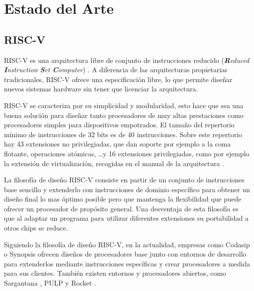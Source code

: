 \chapter{Estado del Arte}

\section{RISC-V}

RISC-V es una arquitectura libre de conjunto de instrucciones reducido (\textit{\textbf{R}educed \textbf{I}nstruction \textbf{S}et \textbf{C}omputer}) \cite{ricv_org}. A diferencia de las arquitecturas propietarias tradicionales, RISC-V ofrece una especificación libre, lo que permite diseñar nuevos sistemas hardware sin tener que licenciar la arquitectura.


RISC-V se caracteriza por su simplicidad y modularidad, esto hace que sea una buena solución para diseñar tanto procesadores de muy altas prestaciones como procesadores simples para dispositivos empotrados. El tamaño del repertorio mínimo de instrucciones de 32 bits es de 40 instrucciones. Sobre este repertorio  hay 43 extensiones no privilegiadas,  que dan soporte por ejemplo a la coma flotante, operaciones atómicas, \ldots y 16 extensiones privilegiadas, como por ejemplo la extensión de virtualización, recogidas en el manual de la arquitectura  \cite{riscv_scpec_unpriv, riscv_scpec_priv}.

La filosofía de diseño RISC-V consiste en partir de un conjunto de instrucciones base sencillo y extenderlo con instrucciones de dominio específico para obtener un diseño final lo mas óptimo posible pero que mantenga la flexibilidad que puede ofrecer un procesador de propósito general. Una desventaja de esta filosofía es que al adaptar un programa para utilizar diferentes extensiones su portabilidad a otros chips se reduce.

Siguiendo la filosofía de diseño RISC-V, en la actualidad, empresas como Codasip \cite{codasip} o Synopsis \cite{synopsis} ofrecen diseños de procesadores base junto con entornos de desarrollo para extenderlos mediante instrucciones específicas y crear procesadores a medida para sus clientes. También existen entornos y procesadores abiertos, como Sargantana \cite{riscv_sargantana}, PULP \cite{riscv_pulp} y Rocket \cite{riscv_rocket}.


